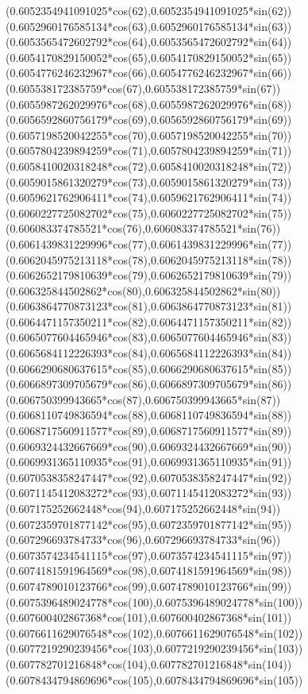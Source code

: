 {({0.6052354941091025*cos(62)},{0.6052354941091025*sin(62)})
({0.6052960176585134*cos(63)},{0.6052960176585134*sin(63)})
({0.6053565472602792*cos(64)},{0.6053565472602792*sin(64)})
({0.6054170829150052*cos(65)},{0.6054170829150052*sin(65)})
({0.6054776246232967*cos(66)},{0.6054776246232967*sin(66)})
({0.605538172385759*cos(67)},{0.605538172385759*sin(67)})
({0.6055987262029976*cos(68)},{0.6055987262029976*sin(68)})
({0.6056592860756179*cos(69)},{0.6056592860756179*sin(69)})
({0.6057198520042255*cos(70)},{0.6057198520042255*sin(70)})
({0.6057804239894259*cos(71)},{0.6057804239894259*sin(71)})
({0.6058410020318248*cos(72)},{0.6058410020318248*sin(72)})
({0.6059015861320279*cos(73)},{0.6059015861320279*sin(73)})
({0.6059621762906411*cos(74)},{0.6059621762906411*sin(74)})
({0.6060227725082702*cos(75)},{0.6060227725082702*sin(75)})
({0.606083374785521*cos(76)},{0.606083374785521*sin(76)})
({0.6061439831229996*cos(77)},{0.6061439831229996*sin(77)})
({0.6062045975213118*cos(78)},{0.6062045975213118*sin(78)})
({0.6062652179810639*cos(79)},{0.6062652179810639*sin(79)})
({0.606325844502862*cos(80)},{0.606325844502862*sin(80)})
({0.6063864770873123*cos(81)},{0.6063864770873123*sin(81)})
({0.6064471157350211*cos(82)},{0.6064471157350211*sin(82)})
({0.6065077604465946*cos(83)},{0.6065077604465946*sin(83)})
({0.6065684112226393*cos(84)},{0.6065684112226393*sin(84)})
({0.6066290680637615*cos(85)},{0.6066290680637615*sin(85)})
({0.6066897309705679*cos(86)},{0.6066897309705679*sin(86)})
({0.606750399943665*cos(87)},{0.606750399943665*sin(87)})
({0.6068110749836594*cos(88)},{0.6068110749836594*sin(88)})
({0.6068717560911577*cos(89)},{0.6068717560911577*sin(89)})
({0.6069324432667669*cos(90)},{0.6069324432667669*sin(90)})
({0.6069931365110935*cos(91)},{0.6069931365110935*sin(91)})
({0.6070538358247447*cos(92)},{0.6070538358247447*sin(92)})
({0.6071145412083272*cos(93)},{0.6071145412083272*sin(93)})
({0.607175252662448*cos(94)},{0.607175252662448*sin(94)})
({0.6072359701877142*cos(95)},{0.6072359701877142*sin(95)})
({0.607296693784733*cos(96)},{0.607296693784733*sin(96)})
({0.6073574234541115*cos(97)},{0.6073574234541115*sin(97)})
({0.6074181591964569*cos(98)},{0.6074181591964569*sin(98)})
({0.6074789010123766*cos(99)},{0.6074789010123766*sin(99)})
({0.6075396489024778*cos(100)},{0.6075396489024778*sin(100)})
({0.607600402867368*cos(101)},{0.607600402867368*sin(101)})
({0.6076611629076548*cos(102)},{0.6076611629076548*sin(102)})
({0.6077219290239456*cos(103)},{0.6077219290239456*sin(103)})
({0.607782701216848*cos(104)},{0.607782701216848*sin(104)})
({0.6078434794869696*cos(105)},{0.6078434794869696*sin(105)})
}
